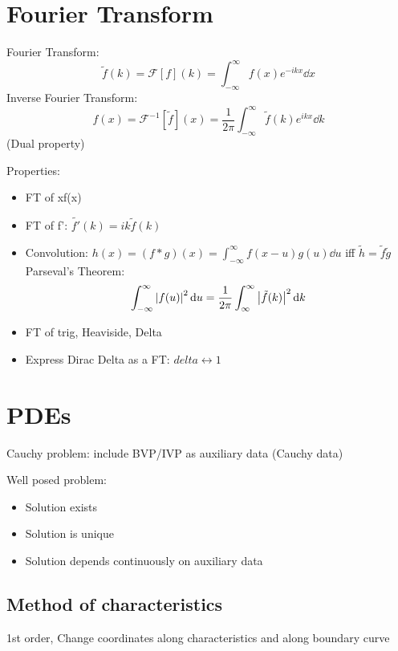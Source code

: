 \section{Fourier Transform}
Fourier Transform:
\[\tilde{f}(k) = \mathcal{F}[f](k) = \int_{-\infty}^\infty f(x)e^{-ikx} \dd x\]
Inverse Fourier Transform:
\[f(x) = \mathcal{F}^{-1}[\tilde{f}](x) = \frac{1}{2\pi} \int_{-\infty}^\infty \tilde{f}(k)e^{ikx} \dd k\]
(Dual property)

Properties:
\begin{itemize}
    \item FT of xf(x)
    \item FT of f': $\tilde{f'}(k) = ik \tilde{f}(k)$
    \item Convolution: $h(x) = (f*g)(x) = \int_{-\infty}^\infty f(x-u)g(u) \dd{u}$ iff $\tilde{h} =\tilde{f}\tilde{g}$
          Parseval's Theorem:
          \[\int_{-\infty}^\infty \left| f(u) \right|^2 \mathrm{d}{u} = \frac{1}{2 \pi} \int_{\infty}^\infty \left| \tilde{f} (k) \right|^2 \mathrm{d}{k}\]
    \item FT of trig, Heaviside, Delta
    \item Express Dirac Delta as a FT: $delta \longleftrightarrow 1$
\end{itemize}


\section{PDEs}
Cauchy problem: include BVP/IVP as auxiliary data (Cauchy data)

Well posed problem:
\begin{itemize}
    \item Solution exists
    \item Solution is unique
    \item Solution depends continuously on auxiliary data
\end{itemize}

\subsection*{Method of characteristics}
1st order,
Change coordinates along characteristics and along boundary curve

